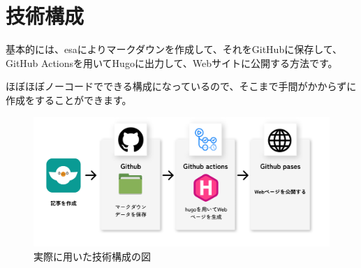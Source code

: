 \chapter{技術構成}
基本的には、esaによりマークダウンを作成して、それをGitHubに保存して、GitHub Actionsを用いてHugoに出力して、Webサイトに公開する方法です。

ほぼほぼノーコードでできる構成になっているので、そこまで手間がかからずに作成をすることができます。

\begin{figure}[H]
  \centering
  \includegraphics[width=14cm]{./image/02-chap4/flow.png}
  \caption{実際に用いた技術構成の図}
  \label{chap4-flow-image}
\end{figure}